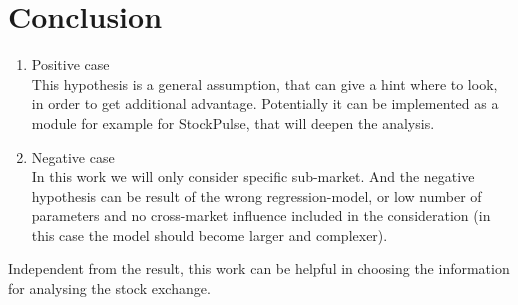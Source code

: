 \documentclass[16pt]{article}
\begin{document}
\newpage
\section {Conclusion}
\begin{enumerate}
	\item Positive case\\
This hypothesis is a general assumption, that can give a hint where to look, in order to get additional advantage. Potentially it can be implemented as a module for example for StockPulse, that will deepen the analysis.
	\item Negative case\\
In this work we will only consider specific sub-market. And the negative hypothesis can be result of the wrong regression-model, or low number of parameters and no cross-market influence included in the consideration (in this case the model should become larger and complexer).
\end{enumerate}
Independent from the result, this work can be helpful in choosing the information for analysing the stock exchange.
\end{document}
